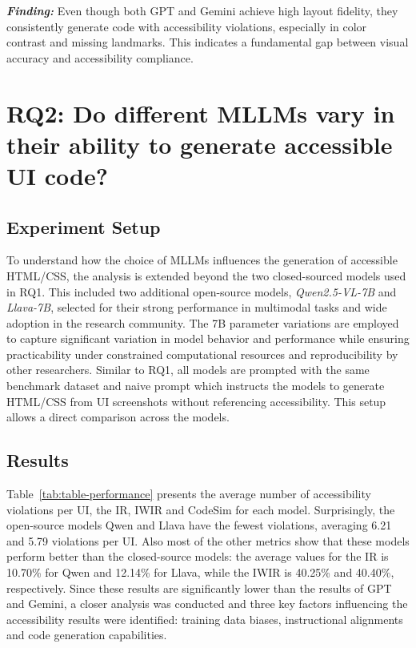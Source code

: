 \begin{center}
\begin{tcolorbox}[colback=black!5!white,colframe=black!75!black,bottom=-0.05pt,top=-0.05pt]
\textit{\textbf{Finding:}} Even though both GPT and Gemini achieve high layout fidelity, 
they consistently generate code with accessibility violations, 
especially in color contrast and missing landmarks. This indicates 
a fundamental gap between visual accuracy and accessibility compliance.
\end{tcolorbox}
\end{center}


\begingroup
    
\endgroup


\section{RQ2: Do different MLLMs vary in their ability to generate accessible UI code?}
\subsection{Experiment Setup}
To understand how the choice of MLLMs influences the generation of 
accessible HTML/CSS, the analysis is extended beyond the two 
closed-sourced models used in RQ1. This included two additional 
open-source models, \textit{Qwen2.5-VL-7B} and \textit{Llava-7B}, 
selected for their strong performance in multimodal tasks and 
wide adoption in the research community. 
The 7B parameter variations are employed to capture significant 
variation in model behavior and performance while ensuring 
practicability under constrained computational resources and 
reproducibility by other researchers.
Similar to RQ1, all models are prompted with the same 
benchmark dataset and naive prompt 
which instructs the models to generate HTML/CSS from UI screenshots
without referencing accessibility. This setup allows a 
direct comparison across the models.

\subsection{Results}
Table~\ref{tab:table-performance} presents the average 
number of accessibility violations per UI, the IR, IWIR and 
CodeSim for each model. Surprisingly, the open-source models
Qwen and Llava have the fewest violations, averaging 
6.21 and 5.79 violations per UI. Also most of the other metrics 
show that these models perform better than the closed-source
models: the average values for the IR is 10.70\% for Qwen and
12.14\% for Llava, while the IWIR is 40.25\%
and 40.40\%, respectively.
Since these results 
are significantly lower than the results of GPT and Gemini, 
a closer analysis was conducted and three key factors 
influencing the accessibility results were identified: 
training data biases, instructional alignments and 
code generation capabilities.

